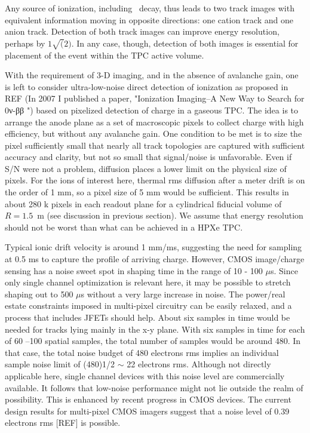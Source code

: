 Any source of ionization, including \bb\ decay, thus leads to two track images with equivalent information moving in opposite directions: one cation track and one anion track. Detection of both track images can improve energy resolution, perhaps by $1\sqrt(2)$.  In any case, though, detection of both images is essential for placement of the event within the TPC active volume.   

With the requirement of 3-D imaging, and in the absence of avalanche gain, one is left to consider ultra-low-noise direct detection of ionization as proposed in REF (In 2007 I published a paper, "Ionization Imaging–A New Way to Search for 0ν-ββ ") based on pixelized detection of charge in a gaseous TPC.  The idea is to arrange the anode plane as a set of macroscopic pixels to collect charge with high efficiency, but without any avalanche gain. One condition to be met is to size the pixel sufficiently small that nearly all track topologies are captured with sufficient accuracy and clarity, but not so small that signal/noise is unfavorable.  Even if S/N were not a problem, diffusion places a lower limit on the physical size of pixels. For the ions of interest here, thermal rms diffusion after a meter drift is on the order of 1 mm, so a pixel size of 5 mm would be sufficient. This results in about 280 k pixels in each readout plane for a cylindrical fiducial volume of $R=1.5$~m (see discussion in previous section). We assume that energy resolution should not be worst than what can be achieved in a HPXe TPC.   

Typical ionic drift velocity is around 1 mm/ms, suggesting the need for sampling at 0.5 ms to capture the profile of arriving charge. However, CMOS image/charge sensing has a noise sweet spot in shaping time in the range of 10 - 100 $\mu$s.  Since only single channel optimization is relevant here, it may be possible to stretch shaping out to 500 $\mu$s without a very large increase in noise.  The power/real estate constraints imposed in multi-pixel circuitry can be easily relaxed, and a process that includes JFETs should help. About six samples in time would be needed for tracks lying mainly in the x-y plane. With six samples in time for each of 60 --100 spatial samples, the total number of samples would be around 480. In that case, the total noise budget of 480 electrons rms implies an individual sample noise limit of (480)1/2 $\sim$ 22 electrons rms.  Although not directly applicable here, single channel devices with this noise level are commercially available.  It follows that low-noise performance might not lie outside the realm of possibility. This is enhanced by recent  
progress in CMOS devices.  The current design results for multi-pixel CMOS imagers suggest that a noise level of 0.39 electrons rms [REF] is possible.  


